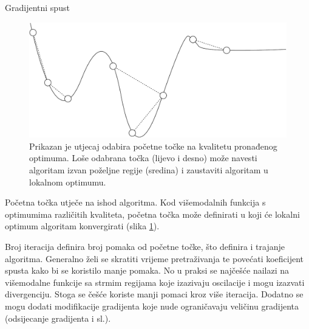 \documentclass[times, utf8, numeric, diplomski]{fer}
\def\figref#1{(slika \ref{#1})}
\begin{document}
\begin{algorithm}[H]
\begin{algorithmic}
  \ENDFOR
{}
\end{algorithmic}
\caption{Gradijentni spust}
\label{alg:grad_spust}
\end{algorithm}

\begin{figure}[H]
\centering
\includegraphics[scale=0.5]{grad_descent_start.pdf}
\caption{Prikazan je utjecaj odabira početne točke na kvalitetu pronađenog optimuma. Loše odabrana točka (lijevo i desno) može navesti algoritam izvan poželjne regije (sredina) i zaustaviti algoritam u lokalnom optimumu.}
\label{fig:pocetna_tocka}
\end{figure}

Početna točka utječe na ishod algoritma. Kod višemodalnih funkcija s optimumima različitih kvaliteta, početna točka može definirati u koji će lokalni optimum algoritam konvergirati \figref{fig:pocetna_tocka}.

Broj iteracija definira broj pomaka od početne točke, što definira i trajanje algoritma. Generalno želi se skratiti vrijeme pretraživanja te povećati koeficijent spusta kako bi se koristilo manje pomaka. No u praksi se najčešće nailazi na višemodalne funkcije sa strmim regijama koje izazivaju oscilacije i mogu izazvati divergenciju. Stoga se češće koriste manji pomaci kroz više iteracija. Dodatno se mogu dodati modifikacije gradijenta koje nude ograničavaju veličinu gradijenta (odsijecanje gradijenta i sl.).
\end{document}
